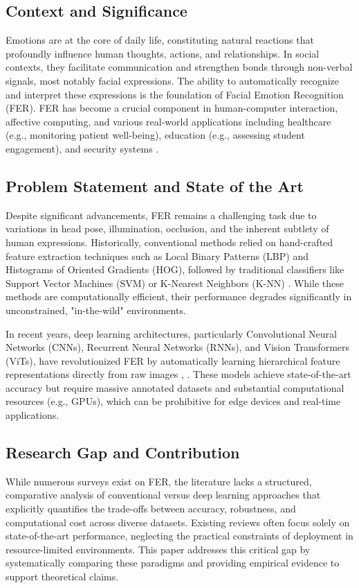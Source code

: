\documentclass[journal]{IEEEtran}
\begin{document}
\subsection{Context and Significance}
Emotions are at the core of daily life, constituting natural reactions that profoundly influence human thoughts, actions, and relationships. In social contexts, they facilitate communication and strengthen bonds through non-verbal signals, most notably facial expressions. The ability to automatically recognize and interpret these expressions is the foundation of Facial Emotion Recognition (FER). FER has become a crucial component in human-computer interaction, affective computing, and various real-world applications including healthcare (e.g., monitoring patient well-being), education (e.g., assessing student engagement), and security systems \cite{ref:zhao2021}.

\subsection{Problem Statement and State of the Art}
Despite significant advancements, FER remains a challenging task due to variations in head pose, illumination, occlusion, and the inherent subtlety of human expressions. Historically, conventional methods relied on hand-crafted feature extraction techniques such as Local Binary Patterns (LBP) and Histograms of Oriented Gradients (HOG), followed by traditional classifiers like Support Vector Machines (SVM) or K-Nearest Neighbors (K-NN) \cite{ref:ko2018}. While these methods are computationally efficient, their performance degrades significantly in unconstrained, "in-the-wild" environments.

In recent years, deep learning architectures, particularly Convolutional Neural Networks (CNNs), Recurrent Neural Networks (RNNs), and Vision Transformers (ViTs), have revolutionized FER by automatically learning hierarchical feature representations directly from raw images \cite{ref:khan2022}, \cite{ref:mellouk2020}. These models achieve state-of-the-art accuracy but require massive annotated datasets and substantial computational resources (e.g., GPUs), which can be prohibitive for edge devices and real-time applications.

\subsection{Research Gap and Contribution}
While numerous surveys exist on FER, the literature lacks a structured, comparative analysis of conventional versus deep learning approaches that explicitly quantifies the trade-offs between accuracy, robustness, and computational cost across diverse datasets. Existing reviews often focus solely on state-of-the-art performance, neglecting the practical constraints of deployment in resource-limited environments. This paper addresses this critical gap by systematically comparing these paradigms and providing empirical evidence to support theoretical claims.
\end{document}
